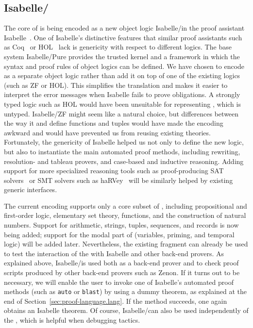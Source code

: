 \documentclass[a4paper]{easychair}
\begin{document}
\subsection{Isabelle/\tlaplus}
\label{sec:backend.isa}

The core of \tlatwo is being encoded as a new object logic
Isabelle/\tlaplus in the proof assistant
Isabelle~\cite{paulson:isabelle}.  One of Isabelle's distinctive
features that similar proof assistants such as Coq~\cite{coq} or
HOL~\cite{gordon:hol,harrison:hol} lack is genericity with respect to
different logics. The base system Isabelle/Pure provides the trusted
kernel and a framework in which the syntax and proof rules of object
logics can be defined. We have chosen to encode \tlatwo as a separate
object logic rather than add it on top of one of the existing logics
(such as ZF or HOL). This simplifies the translation and makes it
easier to interpret the error messages when Isabelle fails to prove
obligations. A strongly typed logic such as HOL would have been
unsuitable for representing \tlatwo, which is untyped. Isabelle/ZF
might seem like a natural choice, but differences between the way it
and \tlaplus define functions and tuples would have made the
encoding awkward and would have prevented us from reusing existing
theories. Fortunately, the genericity of Isabelle helped us not only
to define the new logic, but also to instantiate the main automated
proof methods, including rewriting, resolution- and tableau provers,
and case-based and inductive reasoning.  Adding support for more
specialized reasoning tools such as proof-producing SAT
solvers~\cite{fontaine:automation} or SMT solvers such as
haRVey~\cite{deharbe:decision} will be similarly helped by existing
generic interfaces.

The current encoding supports only a core subset of \tlatwo, including
propositional and first-order logic, elementary set theory, functions,
and the construction of natural numbers.  Support for arithmetic,
strings, tuples, sequences, and records is now being added; support
for the modal part of \tlatwo{} (variables, priming, and temporal
logic) will be added later.  Nevertheless, the existing fragment can
already be used to test the interaction of the \PM with Isabelle and
other back-end provers.  As explained above, Isabelle/\tlaplus is used
both as a back-end prover and to check proof scripts produced by other
back-end provers such as Zenon.  If it turns out to be necessary, we
will enable the user to invoke one of Isabelle's automated proof
methods (such as \texttt{auto} or \texttt{blast}) by using a dummy
theorem, as explained at the end of
Section~\ref{sec:proof-language.lang}.  If the method succeeds, one
again obtains an Isabelle theorem.  Of course,
Isabelle/\tlaplus can also be used independently of the \PM, which is
helpful when debugging tactics.
\end{document}
